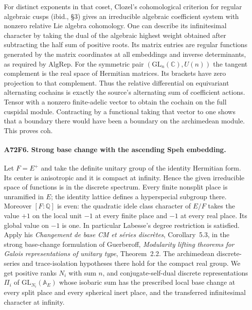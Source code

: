 For distinct exponents in that coset, Clozel's cohomological
criterion for regular algebraic cusps (ibid., \S3) gives an
irreducible algebraic coefficient system with nonzero relative
Lie algebra cohomology. One can describe its infinitesimal
character by taking the dual of the algebraic highest weight
obtained after subtracting the half sum of positive roots.
Its matrix entries are regular functions generated by the
matrix coordinates at all embeddings and inverse determinants,
as required by $\mathrm{AlgRep}$. For the symmetric pair
$(\mathrm{GL}_n(\mathbb C),U(n))$ the tangent complement is
the real space of Hermitian matrices. Its brackets have zero
projection to that complement. Thus the relative differential
on equivariant alternating cochains is exactly the source's
alternating sum of coefficient actions. Tensor with a nonzero
finite-adelic vector to obtain the cochain on the full cuspidal
module. Contracting by a functional taking that vector to one
shows that a boundary there would have been a boundary on the
archimedean module. This proves $\mathrm{coh}$.

\paragraph{A72F6. Strong base change with the ascending Speh embedding.}
Let $F=E^+$ and take the definite unitary group of the identity
Hermitian form. Its center is anisotropic and it is compact at
infinity. Hence the given irreducible space of functions is in the
discrete spectrum. Every finite nonsplit place is unramified in
$E$; the identity lattice defines a hyperspecial subgroup there.
Moreover $[F:\mathbb Q]$ is even: the quadratic idele class
character of $E/F$ takes the value $+1$ on the local unit $-1$
at every finite place and $-1$ at every real place. Its global
value on $-1$ is one. In particular Labesse's degree restriction
is satisfied. Apply his \emph{Changement de base CM et s\'eries
discr\`etes}, Corollary~5.3, in the strong base-change formulation
of Guerberoff, \emph{Modularity lifting theorems for Galois
representations of unitary type}, Theorem~2.2. The archimedean
discrete-series and trace-isolation hypotheses there hold for
the compact real group. We get positive ranks $N_i$ with sum $n$,
and conjugate-self-dual discrete representations $\Pi_i$ of
$\mathrm{GL}_{N_i}(\mathbb A_E)$ whose isobaric sum has the
prescribed local base change at every split place and every
spherical inert place, and the transferred infinitesimal character
at infinity.

